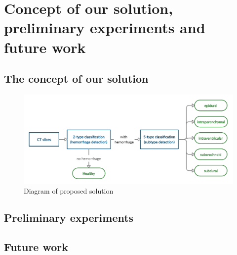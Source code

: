 \chapter{Concept of our solution, preliminary experiments and future work} %

\section{The concept of our solution}

\begin{figure}[!ht]
\begin{centering}
\includegraphics[width=16cm]{assets/images/mySolution.png}
\par\end{centering}
\caption{Diagram of proposed solution \label{fig:solution}}
\end{figure}

\section{Preliminary experiments}
\section{Future work}
